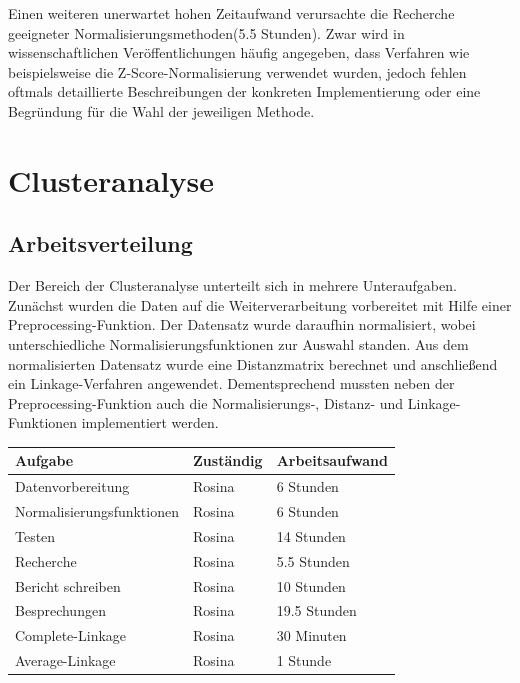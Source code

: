 \documentclass[12pt]{article}
\begin{document}
Einen weiteren unerwartet hohen Zeitaufwand verursachte die Recherche geeigneter Normalisierungsmethoden(5.5 Stunden). Zwar wird in wissenschaftlichen Veröffentlichungen häufig angegeben, dass Verfahren wie beispielsweise die Z-Score-Normalisierung verwendet wurden, jedoch fehlen oftmals detaillierte Beschreibungen der konkreten Implementierung oder eine Begründung für die Wahl der jeweiligen Methode.


\section{Clusteranalyse}
\label{clusteranalyse}

\subsection{Arbeitsverteilung}
\label{cluster-arbeitsverteilung}
Der Bereich der Clusteranalyse unterteilt sich in mehrere Unteraufgaben. Zunächst wurden die Daten auf die Weiterverarbeitung vorbereitet mit Hilfe einer Preprocessing-Funktion. Der Datensatz wurde daraufhin normalisiert, wobei unterschiedliche Normalisierungsfunktionen zur Auswahl standen. Aus dem normalisierten Datensatz wurde eine Distanzmatrix berechnet und anschließend ein Linkage-Verfahren angewendet. Dementsprechend mussten neben der Preprocessing-Funktion auch die Normalisierungs-, Distanz- und Linkage-Funktionen implementiert werden. 

\begin{table}[h]
	\begin{tabular}{l|l|l}
		Aufgabe                       & Zuständig & Arbeitsaufwand \\ 
		\hline
		Datenvorbereitung             & Rosina    & 6 Stunden        \\
		Normalisierungsfunktionen     & Rosina    & 6 Stunden           \\ 
        Testen                        & Rosina    & 14 Stunden        \\
        Recherche                     & Rosina    & 5.5 Stunden        \\
        Bericht schreiben             & Rosina    & 10 Stunden        \\
        Besprechungen                 & Rosina    & 19.5 Stunden        \\
		Complete-Linkage              & Rosina    & 30 Minuten        \\ 
		Average-Linkage               & Rosina    & 1 Stunde         \\ 

	\end{tabular}
\end{table}
\end{document}
